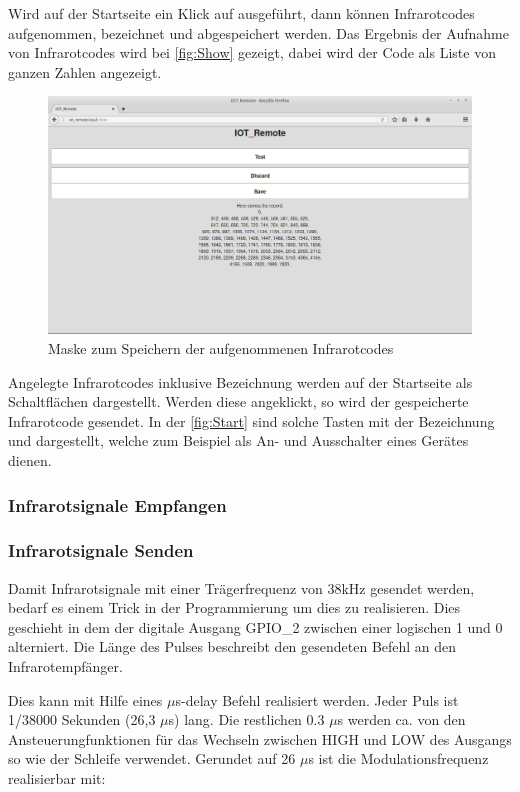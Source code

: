 Wird auf der Startseite ein Klick auf  ausgeführt, dann können Infrarotcodes aufgenommen, bezeichnet und abgespeichert werden.
Das Ergebnis der Aufnahme von Infrarotcodes wird bei \autoref{fig:Show} gezeigt, dabei wird der Code als Liste von ganzen Zahlen angezeigt. 
\begin{figure}[!ht]
	\centering
	\includegraphics[scale=0.3]{Abbildungen/Show}
	\caption{Maske zum Speichern der aufgenommenen Infrarotcodes}
	\label{fig:Show}
\end{figure}
Angelegte Infrarotcodes inklusive Bezeichnung werden auf der Startseite als Schaltflächen dargestellt.
Werden diese angeklickt, so wird der gespeicherte Infrarotcode gesendet.
In der \autoref{fig:Start} sind solche Tasten mit der Bezeichnung  und  dargestellt, welche zum Beispiel als An- und Ausschalter eines Gerätes dienen.

\subsubsection{Infrarotsignale Empfangen}
\subsubsection{Infrarotsignale Senden}
Damit Infrarotsignale mit einer Trägerfrequenz von 38kHz gesendet werden, bedarf es einem Trick in der Programmierung um dies zu realisieren.
Dies geschieht in dem der digitale Ausgang \acs{GPIO}\_2 zwischen einer logischen 1 und 0 alterniert.
Die Länge des Pulses beschreibt den gesendeten Befehl an den Infrarotempfänger.

Dies kann mit Hilfe eines $\mu$s-delay Befehl realisiert werden.
Jeder Puls ist 1/38000 Sekunden (26,3 $\mu$s) lang. Die restlichen 0.3 $\mu$s werden ca. von den Ansteuerungfunktionen für das Wechseln zwischen HIGH und LOW des Ausgangs so wie der Schleife verwendet.
Gerundet auf 26 $\mu$s ist die Modulationsfrequenz realisierbar mit:

